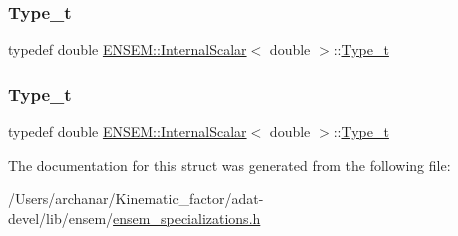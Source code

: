 \mbox{\label{structENSEM_1_1InternalScalar_3_01double_01_4_a27d32499b6d6d1ba4b217a7276cc8916}} 
\subsubsection{\texorpdfstring{Type\_t}{Type\_t}\hspace{0.1cm}{\footnotesize\ttfamily [2/3]}}
{\footnotesize\ttfamily typedef double \mbox{\hyperlink{structENSEM_1_1InternalScalar}{E\+N\+S\+E\+M\+::\+Internal\+Scalar}}$<$ double $>$\+::\mbox{\hyperlink{structENSEM_1_1InternalScalar_3_01double_01_4_a27d32499b6d6d1ba4b217a7276cc8916}{Type\+\_\+t}}}

\mbox{\label{structENSEM_1_1InternalScalar_3_01double_01_4_a27d32499b6d6d1ba4b217a7276cc8916}} 
\subsubsection{\texorpdfstring{Type\_t}{Type\_t}\hspace{0.1cm}{\footnotesize\ttfamily [3/3]}}
{\footnotesize\ttfamily typedef double \mbox{\hyperlink{structENSEM_1_1InternalScalar}{E\+N\+S\+E\+M\+::\+Internal\+Scalar}}$<$ double $>$\+::\mbox{\hyperlink{structENSEM_1_1InternalScalar_3_01double_01_4_a27d32499b6d6d1ba4b217a7276cc8916}{Type\+\_\+t}}}



The documentation for this struct was generated from the following file\+:\begin{DoxyCompactItemize}
\item 
/\+Users/archanar/\+Kinematic\+\_\+factor/adat-\/devel/lib/ensem/\mbox{\hyperlink{adat-devel_2lib_2ensem_2ensem__specializations_8h}{ensem\+\_\+specializations.\+h}}\end{DoxyCompactItemize}
